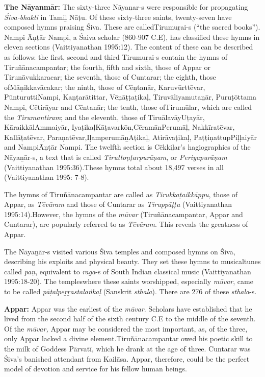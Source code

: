 \textbf{The Nāyanmār:} The sixty-three Nāyaṉar-s were responsible for propagating \textit{Śiva-bhakti} in Tamiḻ Nāṭu. Of these sixty-three saints, twenty-seven have composed hymns praising Śiva. These are called\break Tirumuṟai-s (“the sacred books”). Nampi Āṇṭār Nampi, a Śaiva scholar (860-907 C.E), has classified these hymns in eleven sections (Vaittiya\-nathan 1995:12). The content of these can be described as follows: the first, second and third Tirumuṟai-s contain the hymns of Tiruñānacampantar; the fourth, fifth and sixth, those of Appar or Tirunāvu\-kkaracar; the seventh, those of Cuntarar; the eighth, those of\break Māṇikkavācakar; the ninth, those of Cēṇtanār, Karuvūrttēvar, PūnturuttiNampi, Kaṇṭarātittar, Vēṇāṭṭaṭikaḷ, Tiruvāliyamutaṉār, Puruṭōttama Nampi, Cētirāyar and Cēntanār; the tenth, those of\break Tirumūlar, which are called the \textit{Tirumantiram}; and the eleventh, those of TiruālavāyUṭayār, KāraikkālAmmaiyār, IyaṭikaḷKāṭavarkōṉ,\break CēramāṉPerumāḷ, Nakkīratēvar, Kallāṭatēvar, Paraṇatēvar,\break IḷamperumāṉAṭikaḷ, Atirāvaṭikaḷ, PaṭṭiṇattupPiḷḷaiyār and Nampi\break Āṇṭār Nampi. The twelfth section is Cēkkiḻar’s hagiographies of the Nāyaṉār-s, a text that is called \textit{Tiruttoṇṭarpurāṇam}, or \textit{Periyapurāṇam} (Vaittiyanathan 1995:36).These hymns total about 18,497 verses in all (Vaittiyanathan 1995: 7-8).

The hymns of Tiruñānacampantar are called as \textit{Tirukkaṭaikkāppu}, those of Appar, as \textit{Tēvāram} and those of Cuntarar as \textit{Tiruppāṭṭu }(Vaittiya\-nathan 1995:14).However, the hymns of the \textit{mūvar} (Tiruñānacampantar, Appar and Cuntarar), are popularly referred to as \textit{Tēvāram}. This reveals the greatness of Appar.

The Nāyaṉār-s visited various Śiva temples and composed hymns on Śiva, describing his exploits and physical beauty. They set these hymns to musicaltunes called \textit{paṇ}, equivalent to \textit{raga}-s of South Indian classical music (Vaittiyanathan 1995:18-20). The templeswhere these saints worshipped, especially \textit{mūvar}, came to be called \textit{pāṭalpeṟṟastalaṅkaḷ} (Sanskrit \textit{sthala}). There are 276 of these \textit{sthala}-s.

\textbf{Appar:} Appar was the earliest of the \textit{mūvar}. Scholars have established that he lived from the second half of the sixth century C.E to the middle of the seventh. Of the \textit{mūvar, }Appar may be considered the most important, as, of the three, only Appar lacked a divine element.Tiruñānacampantar owed his poetic skill to the milk of Goddess Pārvatī, which he drank at the age of three. Cuntarar was Śiva’s banished attendant from Kailāsa. Appar, therefore, could be the perfect model of devotion and service for his fellow human beings.


